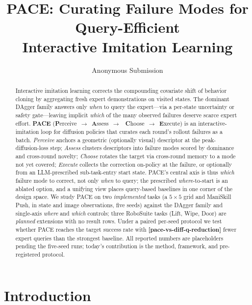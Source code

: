 \documentclass[letterpaper]{article} %
\title{PACE: Curating Failure Modes for Query-Efficient\\ Interactive Imitation Learning}
\author{
    Anonymous Submission
}
\newcommand{\PH}[1]{{\color{red}\textbf{[#1]}}}
\begin{document}
\maketitle

\begin{abstract}
Interactive imitation learning corrects the compounding covariate shift of
behavior cloning by aggregating fresh expert demonstrations on visited states.
The dominant DAgger family answers only \emph{when} to query the expert---via a
per-state uncertainty or safety gate---leaving implicit \emph{which} of the many
observed failures deserve scarce expert effort. \textbf{PACE}
(\textbf{P}erceive~$\rightarrow$~\textbf{A}ssess~$\rightarrow$~%
\textbf{C}hoose~$\rightarrow$~\textbf{E}xecute) is an interactive-imitation loop
for diffusion policies that curates each round's rollout failures as a batch.
\emph{Perceive} anchors a geometric (optionally visual) descriptor at the
peak-diffusion-loss step; \emph{Assess} clusters descriptors into failure modes
scored by dominance and cross-round novelty; \emph{Choose} rotates the target via
cross-round memory to a mode not yet covered; \emph{Execute} collects the
correction on-policy at the failure, or optionally from an LLM-prescribed
sub-task-entry start state. PACE's central axis is thus \emph{which} failure mode
to correct, not only \emph{when} to query; the prescribed \emph{where}-to-start is
an ablated option, and a unifying view places query-based baselines in one corner
of the design space. We study PACE on two \emph{implemented} tasks (a $5\times5$
grid and ManiSkill Push, in state and image observations, five seeds) against the
DAgger family and single-axis \emph{where} and \emph{which} controls; three
RoboSuite tasks (Lift, Wipe, Door) are \emph{planned} extensions with no result
rows. Under a paired per-seed protocol we test whether PACE reaches the target
success rate with \PH{pace-vs-diff-q-reduction} fewer expert queries than the
strongest baseline. All reported numbers are placeholders pending the five-seed
runs; today's contribution is the method, framework, and pre-registered protocol.
\end{abstract}

\section{Introduction}
\end{document}
